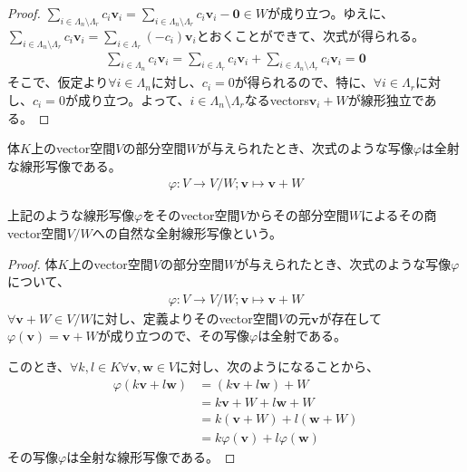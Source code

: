 \documentclass[dvipdfmx]{jsarticle}
\begin{document}
\begin{proof}
$\sum_{i \in \varLambda_{n} \setminus \varLambda_{r}} {c_{i}\mathbf{v}_{i}} = \sum_{i \in \varLambda_{n} \setminus \varLambda_{r}} {c_{i}\mathbf{v}_{i}} - \mathbf{0} \in W$が成り立つ。ゆえに、$\sum_{i \in \varLambda_{n} \setminus \varLambda_{r}} {c_{i}\mathbf{v}_{i}} = \sum_{i \in \varLambda_{r}} {\left( - c_{i} \right)\mathbf{v}_{i}}$とおくことができて、次式が得られる。
\begin{align*}
\sum_{i \in \varLambda_{n}} {c_{i}\mathbf{v}_{i}} = \sum_{i \in \varLambda_{r}} {c_{i}\mathbf{v}_{i}} + \sum_{i \in \varLambda_{n} \setminus \varLambda_{r}} {c_{i}\mathbf{v}_{i}} = \mathbf{0}
\end{align*}
そこで、仮定より$\forall i \in \varLambda_{n}$に対し、$c_{i} = 0$が得られるので、特に、$\forall i \in \varLambda_{r}$に対し、$c_{i} = 0$が成り立つ。よって、$i \in \varLambda_{n} \setminus \varLambda_{r}$なるvectors$\mathbf{v}_{i} + W$が線形独立である。
\end{proof}
\begin{thm}\label{2.4.1.15}
体$K$上のvector空間$V$の部分空間$W$が与えられたとき、次式のような写像$\varphi$は全射な線形写像である。
\begin{align*}
\varphi:V \rightarrow {V}/{W};\mathbf{v} \mapsto \mathbf{v} + W
\end{align*}
\end{thm}
\begin{dfn}
上記のような線形写像$\varphi$をそのvector空間$V$からその部分空間$W$によるその商vector空間${V}/{W}$への自然な全射線形写像という。
\end{dfn}
\begin{proof}
体$K$上のvector空間$V$の部分空間$W$が与えられたとき、次式のような写像$\varphi$について、
\begin{align*}
\varphi:V \rightarrow {V}/{W};\mathbf{v} \mapsto \mathbf{v} + W
\end{align*}
$\forall\mathbf{v} + W \in {V}/{W}$に対し、定義よりそのvector空間$V$の元$\mathbf{v}$が存在して$\varphi\left( \mathbf{v} \right) = \mathbf{v} + W$が成り立つので、その写像$\varphi$は全射である。\par
このとき、$\forall k,l \in K\forall\mathbf{v},\mathbf{w} \in V$に対し、次のようになることから、
\begin{align*}
\varphi\left( k\mathbf{v} + l\mathbf{w} \right) &= \left( k\mathbf{v} + l\mathbf{w} \right) + W\\
&= k\mathbf{v} + W + l\mathbf{w} + W\\
&= k\left( \mathbf{v} + W \right) + l\left( \mathbf{w} + W \right)\\
&= k\varphi\left( \mathbf{v} \right) + l\varphi\left( \mathbf{w} \right)
\end{align*}
その写像$\varphi$は全射な線形写像である。
\end{proof}
\end{document}
